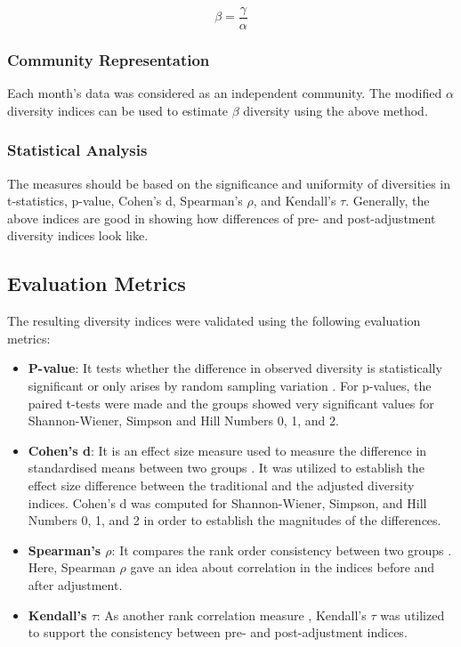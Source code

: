 \documentclass[a4paper,12pt]{article}
\begin{document}
\[
\beta = \frac{\gamma}{\alpha}
\]


\subsubsection{Community Representation}
Each month's data was considered as an independent community. The modified $\alpha$ diversity indices can be used to estimate $\beta$ diversity using the above method.


\subsubsection{Statistical Analysis}
The measures should be based on the significance and uniformity of diversities in t-statistics, p-value, Cohen's d, Spearman's $\rho$, and Kendall's $\tau$. Generally, the above indices are good in showing how differences of pre- and post-adjustment diversity indices look like.

\subsection{Evaluation Metrics}
The resulting diversity indices were validated using the following evaluation metrics:

\begin{itemize}
    \item \textbf{P-value}: It tests whether the difference in observed diversity is statistically significant or only arises by random sampling variation \citep{wasserstein2016asa}. For p-values, the paired t-tests were made and the groups showed very significant values for Shannon-Wiener, Simpson and Hill Numbers 0, 1, and 2.
    \item \textbf{Cohen’s d}: It is an effect size measure used to measure the difference in standardised means between two groups \citep{lakens2013calculating}. It was utilized to establish the effect size difference between the traditional and the adjusted diversity indices. Cohen's d was computed for Shannon-Wiener, Simpson, and Hill Numbers 0, 1, and 2 in order to establish the magnitudes of the differences.
    \item \textbf{Spearman’s $\rho$}: It compares the rank order consistency between two groups \citep{hauke2011comparison}. Here, Spearman $\rho$ gave an idea about correlation in the indices before and after adjustment.
    \item \textbf{Kendall’s $\tau$}: As another rank correlation measure \citep{knight1966computer}, Kendall's $\tau$ was utilized to support the consistency between pre- and post-adjustment indices.
\end{itemize}
\end{document}

